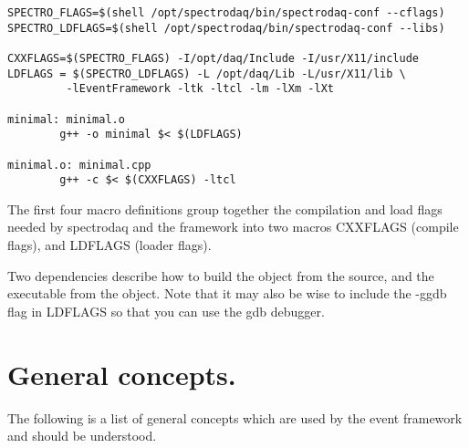 \footnotesize\begin{verbatim}SPECTRO_FLAGS=$(shell /opt/spectrodaq/bin/spectrodaq-conf --cflags)
SPECTRO_LDFLAGS=$(shell /opt/spectrodaq/bin/spectrodaq-conf --libs)

CXXFLAGS=$(SPECTRO_FLAGS) -I/opt/daq/Include -I/usr/X11/include
LDFLAGS = $(SPECTRO_LDFLAGS) -L /opt/daq/Lib -L/usr/X11/lib \
         -lEventFramework -ltk -ltcl -lm -lXm -lXt

minimal: minimal.o
        g++ -o minimal $< $(LDFLAGS)

minimal.o: minimal.cpp
        g++ -c $< $(CXXFLAGS) -ltcl 
\end{verbatim}\normalsize 
 The first four macro definitions group together the compilation and load flags needed by spectrodaq and the  framework into two macros CXXFLAGS (compile flags), and LDFLAGS (loader  flags).

Two dependencies describe how to build the object from the source, and the executable from the object. Note that it may also be wise to  include the -ggdb flag in LDFLAGS so that you can use the gdb debugger.

\section{General concepts.}\label{Concepts}


The following is a list of general concepts which are used by the event framework and should be understood.

